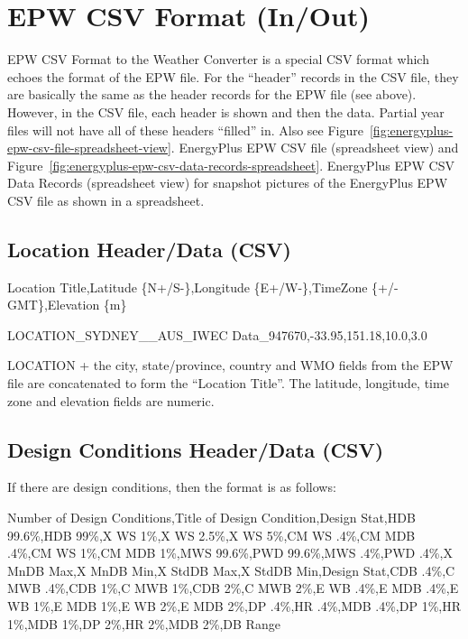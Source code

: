 \section{EPW CSV Format (In/Out)}\label{epw-csv-format-inout}

EPW CSV Format to the Weather Converter is a special CSV format which echoes the format of the EPW file. For the ``header'' records in the CSV file, they are basically the same as the header records for the EPW file (see above). However, in the CSV file, each header is shown and then the data. Partial year files will not have all of these headers ``filled'' in. Also see Figure~\ref{fig:energyplus-epw-csv-file-spreadsheet-view}. EnergyPlus EPW CSV file (spreadsheet view) and Figure~\ref{fig:energyplus-epw-csv-data-records-spreadsheet}. EnergyPlus EPW CSV Data Records (spreadsheet view) for snapshot pictures of the EnergyPlus EPW CSV file as shown in a spreadsheet.

\subsection{Location Header/Data (CSV)}\label{location-headerdata-csv}

Location Title,Latitude \{N+/S-\},Longitude \{E+/W-\},TimeZone \{+/- GMT\},Elevation \{m\}

LOCATION\_SYDNEY\_\_AUS\_IWEC Data\_947670,-33.95,151.18,10.0,3.0

LOCATION + the city, state/province, country and WMO fields from the EPW file are concatenated to form the ``Location Title''. The latitude, longitude, time zone and elevation fields are numeric.

\subsection{Design Conditions Header/Data (CSV)}\label{design-conditions-headerdata-csv}

If there are design conditions, then the format is as follows:

Number of Design Conditions,Title of Design Condition,Design Stat,HDB 99.6\%,HDB 99\%,X WS 1\%,X WS 2.5\%,X WS 5\%,CM WS .4\%,CM MDB .4\%,CM WS 1\%,CM MDB 1\%,MWS 99.6\%,PWD 99.6\%,MWS .4\%,PWD .4\%,X MnDB Max,X MnDB Min,X StdDB Max,X StdDB Min,Design Stat,CDB .4\%,C MWB .4\%,CDB 1\%,C MWB 1\%,CDB 2\%,C MWB 2\%,E WB .4\%,E MDB .4\%,E WB 1\%,E MDB 1\%,E WB 2\%,E MDB 2\%,DP .4\%,HR .4\%,MDB .4\%,DP 1\%,HR 1\%,MDB 1\%,DP 2\%,HR 2\%,MDB 2\%,DB Range

